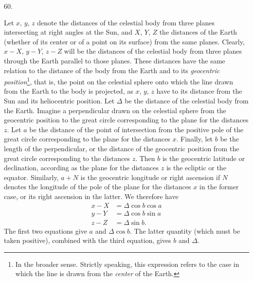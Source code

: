 \par\medskip
\hypertarget{native-079-article060}{}
\begin{center}60.\end{center}
Let $x$, $y$, $z$ denote the distances of the celestial body from three planes intersecting at right angles at the Sun, and $X$, $Y$, $Z$ the distances of the Earth (whether of its center or of a point on its surface) from the same planes. Clearly, $x-X$, $y-Y$, $z-Z$ will be the distances of the celestial body from three planes through the Earth parallel to those planes. These distances have the same relation to the distance of the body from the Earth and to its \textit{geocentric position}\footnote{In the broader sense. Strictly speaking, this expression refers to the case in which the line is drawn from the \textit{center} of the Earth.}, that is, the point on the celestial sphere onto which the line drawn from the Earth to the body is projected, as $x$, $y$, $z$ have to its distance from the Sun and its heliocentric position. Let $\Delta$ be the distance of the celestial body from the Earth. Imagine a perpendicular drawn on the celestial sphere from the geocentric position to the great circle corresponding to the plane for the distances $z$. Let $a$ be the distance of the point of intersection from the positive pole of the great circle corresponding to the plane for the distances $x$. Finally, let $b$ be the length of the perpendicular, or the distance of the geocentric position from the great circle corresponding to the distances $z$. Then $b$ is the geocentric latitude or declination, according as the plane for the distances $z$ is the ecliptic or the equator. Similarly, $a+N$ is the geocentric longitude or right ascension if $N$ denotes the longitude of the pole of the plane for the distances $x$ in the former case, or its right ascension in the latter. We therefore have
\[
\begin{aligned}
x-X&=\Delta\cos b\cos a\\
y-Y&=\Delta\cos b\sin a\\
z-Z&=\Delta\sin b.
\end{aligned}
\]
The first two equations give $a$ and $\Delta\cos b$. The latter quantity (which must be taken positive), combined with the third equation, gives $b$ and $\Delta$.
